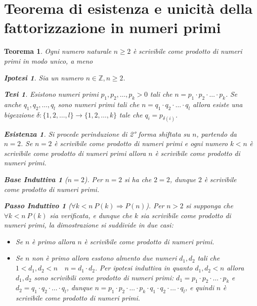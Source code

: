\documentclass{article}
\makeatletter
\renewenvironment{proof}[1][\proofname]{\par
    \pushQED{\qed}%
    \normalfont \topsep6\p@\@plus6\p@\relax
    \trivlist
    \item\relax
    {\itshape
    #1\@addpunct{.}}\hspace\labelsep\ignorespaces
    }{%
    \popQED\endtrivlist\@endpefalse
}
\newtheorem{theorem}{Teorema}[part]
\newtheorem{ipothesis}[lemma]{Ipotesi}
\newtheorem{thesis}[lemma]{Tesi}
\theoremstyle{definition}
\newtheorem*{existence}{Esistenza}
\newtheorem*{base}{Base Induttiva}
\newtheorem*{step}{Passo Induttivo}
\makeatother
\begin{document}
\section{Teorema di esistenza e unicità della fattorizzazione in numeri primi}
\begin{theorem}
    Ogni numero naturale \(n\geq 2\) è scrivibile come prodotto di numeri primi in modo unico, a meno 
    \begin{ipothesis}
        Sia un numero \(n\in\mathbb{Z}, n\geq 2\).
    \end{ipothesis}
    \begin{thesis}
        Esistono numeri primi \(p_1,p_2,\ldots,p_k>0\) tali che \(n=p_1\cdot p_2\cdot\ldots\cdot p_k\).
        Se anche \(q_1,q_2,\ldots,q_l\) sono numeri primi tali che \(n=q_1\cdot q_2\cdot\ldots\cdot q_l\) allora esiste una bigezzione \(\delta:\{1,2,\ldots,l\}\rightarrow \{1,2,\ldots,k\}\) tale che \(q_i=p_{\delta(i)}\).
    \end{thesis}
    \begin{proof}
        \begin{existence}
            Si procede perinduzione di 2° forma shiftata su \(n\), partendo da \(n=2\).
            Se \(n=2\) è scrivibile come prodotto di numeri primi e ogni numero \(k<n\) è scrivibile come prodotto di numeri primi allora \(n\) è scrivibile come prodotto di numeri primi.
            \begin{base}[$n=2$]
                Per \(n=2\) si ha che \(2=2\), dunque \(2\) è scrivibile come prodotto di numeri primi.
            \end{base}
            \begin{step}[$\forall k<n\ P(k)\Rightarrow P(n)$]
                Per \(n>2\) si supponga che \(\forall k<n\ P(k)\) sia verificata, e dunque che \(k\) sia scrivibile come prodotto di numeri primi, la dimostrazione si suddivide in due casi:
                \begin{itemize}
                    \item Se \(n\) è primo allora \(n\) è scrivibile come prodotto di numeri primi.
                    \item Se \(n\) non è primo allora esstono almento due numeri \(d_1,d_2\) tali che \(1<d_1,d_2<n\quad n=d_1\cdot d_2\). Per ipotesi induttiva in quanto \(d_1,d_2<n\) allora \(d_1,d_2\) sono scrivibili come prodotto di numeri primi: \(d_1=p_1\cdot p_2\cdot\ldots\cdot p_k\) e \(d_2=q_1\cdot q_2\cdot\ldots\cdot q_l\), dunque \(n=p_1\cdot p_2\cdot\ldots\cdot p_k\cdot q_1\cdot q_2\cdot\ldots\cdot q_l\), e quindi \(n\) è scrivibile come prodotto di numeri primi.

\end{itemize}
\end{step}
\end{existence}
\end{proof}
\end{theorem}
\end{document}
